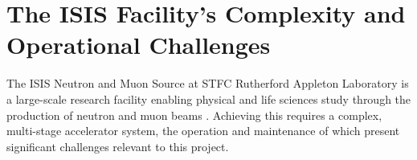 \documentclass[10pt,oneside]{report}
\begin{document}


\section{The ISIS Facility's Complexity and Operational Challenges}\label{sec:isisbg}




The ISIS Neutron and Muon Source at STFC Rutherford Appleton Laboratory is a large-scale research facility enabling physical and life sciences study through the production of neutron and muon beams \cite{thomason2019isis}. Achieving this requires a complex, multi-stage accelerator system, the operation and maintenance of which present significant challenges relevant to this project.
\end{document}
